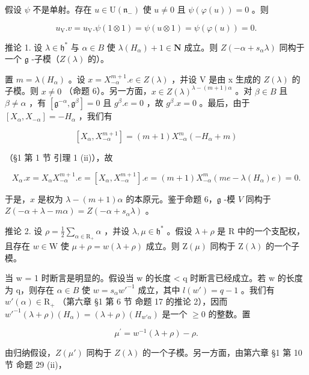 假设 \(\psi\) 不是单射。存在 \(u \in \mathrm{U}(\mathfrak{n}_{-})\) 使 \(u \neq 0\) 且 \(\psi(\varphi(u)) = 0\) 。则

\[
u _ {\mathrm{V}}. v = u _ {\mathrm{V}}. \psi (1 \otimes 1) = \psi (u \otimes 1) = \psi (\varphi (u)) = 0.
\]

推论 1. 设 \(\lambda \in \mathfrak{h}^*\) 与 \(\alpha \in B\) 使 \(\lambda(H_{\alpha}) + 1 \in \mathbf{N}\) 成立。则 \(Z(-\alpha + s_{\alpha}\lambda)\) 同构于一个 \(\mathfrak{g}\) -子模（\(Z(\lambda)\) 的）。

置 \(m = \lambda(H_{\alpha})\) 。设 \(x = X_{-\alpha}^{m+1}.e \in Z(\lambda)\) ，并设 V 是由 x 生成的 \(Z(\lambda)\) 的子模。则 \(x \neq 0\) （命题 6）。另一方面，\(x \in Z(\lambda)^{\lambda-(m+1)\alpha}\) 。对 \(\beta \in B\) 且 \(\beta \neq \alpha\) ，有 \([\mathfrak{g}^{-\alpha}, \mathfrak{g}^{\beta}] = 0\) 且 \(g^{\beta}.e = 0\) ，故 \(g^{\beta}.x = 0\) 。最后，由于 \([X_{\alpha}, X_{-\alpha}] = -H_{\alpha}\) ，我们有

\[
[ X _ {\alpha}, X _ {- \alpha} ^ {m + 1} ] = (m + 1) X _ {- \alpha} ^ {m} (- H _ {\alpha} + m)
\]

（§1 第 1 节 引理 1 (ii)），故

\[
X _ {\alpha}. x = X _ {\alpha} X _ {- \alpha} ^ {m + 1}. e = [ X _ {\alpha}, X _ {- \alpha} ^ {m + 1} ]. e = (m + 1) X _ {- \alpha} ^ {m} (m e - \lambda (H _ {\alpha}) e) = 0.
\]

于是，\(x\) 是权为 \(\lambda - (m + 1)\alpha\) 的本原元。鉴于命题 6，\(\mathfrak{g}\) -模 \(V\) 同构于 \(Z(-\alpha + \lambda - m\alpha) = Z(-\alpha + s_{\alpha}\lambda)\) 。

推论 2. 设 \(\rho = \frac{1}{2}\sum_{\alpha \in \mathrm{R}_{+}}\alpha\) ，并设 \(\lambda, \mu \in \mathfrak{h}^*\) 。假设 \(\lambda + \rho\) 是 \(\mathrm{R}\) 中的一个支配权，且存在 \(w \in \mathrm{W}\) 使 \(\mu + \rho = w(\lambda + \rho)\) 成立。则 \(\mathrm{Z}(\mu)\) 同构于 \(\mathrm{Z}(\lambda)\) 的一个子模。

当 w = 1 时断言是明显的。假设当 w 的长度 \textless{} q 时断言已经成立。若 w 的长度为 q，则存在 \(\alpha \in B\) 使 \(w = s_{\alpha}w'^{-1}\) 成立，其中 \(l(w') = q - 1\) 。我们有 \(w'(\alpha) \in \mathrm{R}_{+}\) （第六章 §1 第 6 节 命题 17 的推论 2），因而 \(w'^{-1}(\lambda + \rho)(H_{\alpha}) = (\lambda + \rho)(H_{w'\alpha})\) 是一个 \(\geq 0\) 的整数。置

\[
\mu^ {\prime} = w ^ {- 1} (\lambda + \rho) - \rho .
\]

由归纳假设，\(Z(\mu')\) 同构于 \(Z(\lambda)\) 的一个子模。另一方面，由第六章 §1 第 10 节 命题 29 (ii)，

